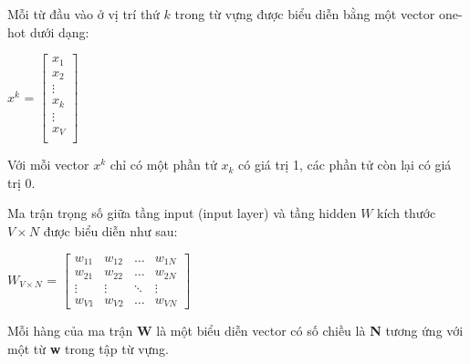 Mỗi từ đầu vào ở vị trí thứ $k$ trong từ vựng được biểu diễn bằng một vector one-hot dưới dạng:
\begin{center}
    $x^{k}$ =
    $\begin{bmatrix}
        x_{1}\\
        x_{2} \\
        \vdots \\
        x_{k} \\
        \vdots \\
        x_{V} \\
    \end{bmatrix}$
\end{center}

Với mỗi vector $x^{k}$ chỉ có một phần tử $x_{k}$ có giá trị 1, các phần tử còn lại có giá trị 0.

Ma trận trọng số giữa tầng input (input layer) và tầng hidden $W$ kích thước $V\times N$ được biểu diễn như sau:
\begin{center}
    $W_{V\times N}$ =
    $\begin{bmatrix}
        w_{11} & w_{12} & \dots & w_{1N}\\
        w_{21} & w_{22} & \dots & w_{2N} \\
        \vdots & \vdots & \ddots & \vdots \\
        w_{V1} & w_{V2} & \dots & w_{VN}
    \end{bmatrix}$
\end{center}

Mỗi hàng của ma trận \textbf{W}  là một biểu diễn vector có số chiều là \textbf{N} tương ứng với một từ \textbf{w} trong tập từ vựng.

